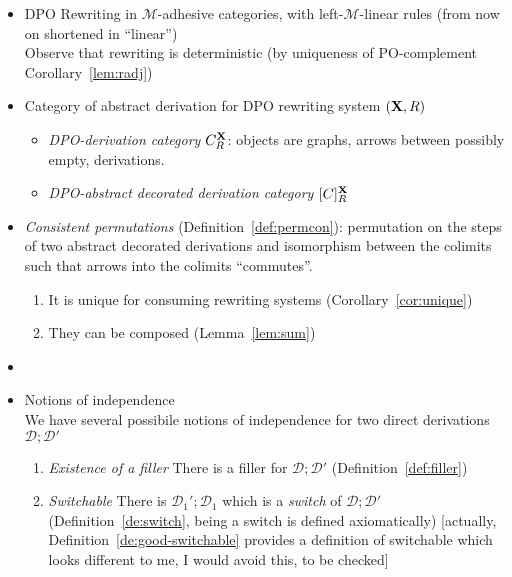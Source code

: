 \documentclass[a4paper,UKenglish,cleveref,pdftex, thm-restate,numberwithinsect]{lipics}
\newcommand{\dpo}{\textsc{dpo}}
\def\R{\mathsf{R}}
\def\X{\textbf {\textup{X}}}
\newcommand{\dder}[1]{\mathscr{#1}}
\def\dpo{\mathsf{C}^{\X}_R}
\def\dpi{[\mathsf{C}]^{\X}_R}
\begin{document}
\begin{itemize}
\item DPO Rewriting in $\mathcal{M}$-adhesive categories, with left-$\mathcal{M}$-linear rules (from now on shortened in ``linear'')\\
  Observe that rewriting is deterministic (by uniqueness of
  PO-complement Corollary~\ref{lem:radj})
  
\item Category of abstract derivation for DPO rewriting system $(\X, \R)$
  \begin{itemize}
  \item \emph{DPO-derivation category} $\dpo$: objects are graphs, arrows between possibly empty, derivations.
  \item \emph{DPO-abstract decorated derivation category} $\dpi$
  \end{itemize}



\item \emph{Consistent permutations} (Definition~\ref{def:permcon}):
  permutation on the steps of two abstract decorated derivations and isomorphism between the colimits such
  that arrows into the colimits ``commutes''.
  \begin{enumerate}
  \item It is unique for consuming rewriting systems
    (Corollary~\ref{cor:unique})
  \item They can be composed (Lemma~\ref{lem:sum})
  \end{enumerate}
\item 

  
\item Notions of independence\\
  We have several possibile notions of independence for two direct
  derivations $\dder{D} ; \dder{D'}$
  \begin{enumerate}
    
  \item \emph{Existence of a filler}
    There is a filler for $\dder{D} ; \dder{D'}$
    (Definition~\ref{def:filler})

  \item \emph{Switchable}
    There is $\dder{D}_1' ; \dder{D}_1$ which is a \emph{switch}
    of $\dder{D} ; \dder{D'}$ (Definition~\ref{de:switch}, being a
    switch is defined axiomatically) [actually, Definition~\ref{de:good-switchable} provides a definition of switchable which looks different to me, I would avoid this, to be checked] 


\end{enumerate}
\end{itemize}
\end{document}

